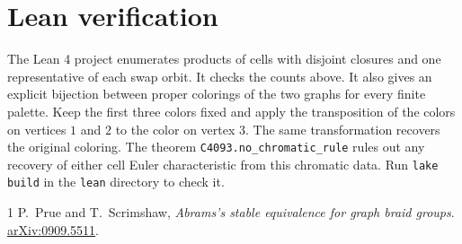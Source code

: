 \documentclass[11pt]{article}
\begin{document}
\section*{Lean verification}

The Lean 4 project enumerates products of cells with disjoint closures
and one representative of each swap orbit. It checks the counts above.
It also gives an explicit bijection between proper colorings of the two
graphs for every finite palette. Keep the first three colors fixed and
apply the transposition of the colors on vertices $1$ and $2$ to the color
on vertex $3$. The same transformation recovers the original coloring.
The theorem \texttt{C4093.no\_chromatic\_rule} rules out any recovery of
either cell Euler characteristic from this chromatic data. Run
\texttt{lake build} in the \texttt{lean} directory to check it.

\begin{thebibliography}{1}
P.~Prue and T.~Scrimshaw, \emph{Abrams's stable equivalence for graph braid groups}.
\href{https://arxiv.org/abs/0909.5511}{arXiv:0909.5511}.
\end{thebibliography}
\end{document}
